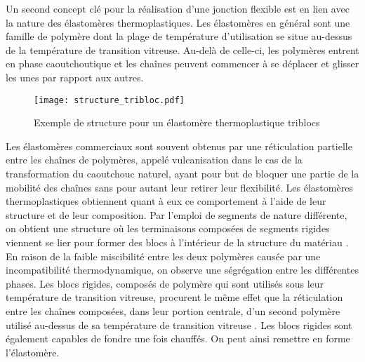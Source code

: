 \newcommand\setpolymerdelim[2]{\def\delimleft{#1}\def\delimright{#2}}
\def\makebraces[#1,#2]#3#4#5{%
	\edef\delimhalfdim{\the\dimexpr(#1+#2)/2}%
	\edef\delimvshift{\the\dimexpr(#1-#2)/2}%
	\chemmove{%
		\node[at=(#4),yshift=(\delimvshift)]
		{$\left\delimleft\vrule height\delimhalfdim depth\delimhalfdim
			width0pt\right.$};%
		\node[at=(#5),yshift=(\delimvshift)]
		{$\left.\vrule height\delimhalfdim depth\delimhalfdim
			width0pt\right\delimright_{\rlap{$\scriptstyle#3$}}$};}}
\setpolymerdelim()

Un second concept clé pour la réalisation d'une jonction flexible est en lien avec la nature des élastomères thermoplastiques. 
Les élastomères en général sont une famille de polymère dont la plage de température d'utilisation se situe au-dessus de la température de transition vitreuse. 
Au-delà de celle-ci, les polymères entrent en phase caoutchoutique et les chaînes peuvent commencer à se déplacer et glisser les unes par rapport aux autres. 

\begin{figure}[h]
	\centering
	\texttt{[image: structure\_tribloc.pdf]}
	\caption{Exemple de structure pour un élastomère thermoplastique triblocs}
	\label{fig:structure_tribloc}
\end{figure}

Les élastomères commerciaux sont souvent obtenus par une réticulation partielle entre les chaînes de polymères, appelé vulcanisation dans le cas de la transformation du  caoutchouc naturel, ayant pour but de bloquer une partie de la mobilité des chaînes sans pour autant leur retirer leur flexibilité. 
Les élastomères thermoplastiques obtiennent quant à eux ce comportement à l'aide de leur structure et de leur composition. 
Par l'emploi de segments de nature différente, on obtient une structure où les terminaisons composées de segments rigides viennent se lier pour former des blocs à l'intérieur de la structure du matériau \cite{Holden1969}. 
En raison de la faible miscibilité entre les deux polymères causée par une incompatibilité thermodynamique, on observe une ségrégation entre les différentes phases. 
Les blocs rigides, composés de polymère qui sont utilisés sous leur température de transition vitreuse, procurent le même effet que la réticulation entre les chaînes composées, dans leur portion centrale, d'un second polymère utilisé au-dessus de sa température de transition vitreuse \cite{Holden2002}. 
Les blocs rigides sont également capables de fondre une fois chauffés.
On peut ainsi remettre en forme l'élastomère. 

